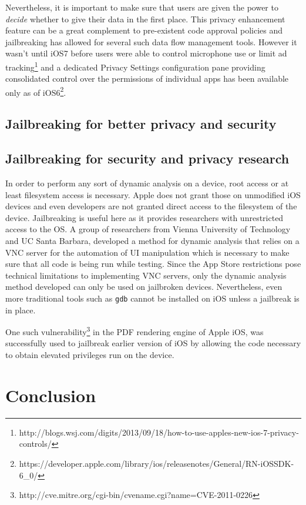 \documentclass[12pt, titlepage, oneside]{amsart}
\begin{document}
Nevertheless, it is important to make sure that users are given the power to \emph{decide} whether to give their data in the first place. This privacy enhancement feature can be a great complement to pre-existent code approval policies and jailbreaking has allowed for several such data flow management tools. However it wasn't until iOS7 before users were able to control microphone use or limit ad tracking\footnote{http://blogs.wsj.com/digits/2013/09/18/how-to-use-apples-new-ios-7-privacy-controls/} and a dedicated Privacy Settings configuration pane providing consolidated control over the permissions of individual apps has been available only as of iOS6\footnote{https://developer.apple.com/library/ios/releasenotes/General/RN-iOSSDK-6\_0/}. 

\subsection{Jailbreaking for better privacy and security}

\subsection{Jailbreaking for security and privacy research}
In order to perform any sort of dynamic analysis on a device, root access or at least filesystem access is necessary. Apple does not grant those on unmodified iOS devices and even developers are not granted direct access to the filesystem of the device. Jailbreaking is useful here as it provides researchers with unrestricted access to the OS. 
A group of researchers from Vienna University of Technology and UC Santa Barbara\cite{dynamic}, developed a method for dynamic analysis that relies on a VNC server for the automation of UI manipulation which is necessary to make sure that all code is being run while testing. Since the App Store restrictions pose technical limitations to implementing VNC servers, only the dynamic analysis method developed can only be used on jailbroken devices. Nevertheless, even more traditional tools such as \texttt{gdb} cannot be installed on iOS unless a jailbreak is in place.

One such vulnerability\footnote{http://cve.mitre.org/cgi-bin/cvename.cgi?name=CVE-2011-0226} in the PDF rendering engine of Apple iOS\cite{pios}, was successfully used to jailbreak earlier version of iOS by allowing the code necessary to obtain elevated privileges run on the device. 


\section{Conclusion}


\nocite{*} 




\end{document}
